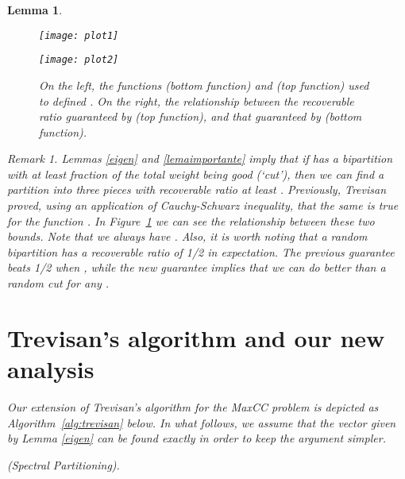 \documentclass{article}
\newtheorem{lemma}[theorem]{Lemma}
\theoremstyle{definition}
\theoremstyle{remark}
\newtheorem{rem}[theorem]{Remark}
\numberwithin{equation}{section}
\begin{document}
\begin{lemma}
\begin{figure}[ht!]
\begin{minipage}[t]{.5\textwidth}
  \centering
  \texttt{[image: plot1]}
\end{minipage}\begin{minipage}[t]{.5\textwidth}
  \centering
  \texttt{[image: plot2]}
\end{minipage}
  \caption{On the left, the functions  (bottom function) and  (top function) used to defined . On the right, the relationship between the recoverable ratio guaranteed by  (top function), and that guaranteed by  (bottom function). }
  \label{fig:plot1}
\end{figure}
\medskip
\begin{rem}\label{remark}
{\rm Lemmas \ref{eigen} and \ref{lemaimportante} imply that if  has a bipartition with at least  fraction of the total weight being good (`cut'), then we can  find a partition into three pieces  with recoverable ratio at least . 
Previously, Trevisan proved, using an application of Cauchy-Schwarz inequality, that the same is true for the function . In Figure~\ref{fig:plot1} we can see the relationship between these two bounds. Note that we always have . Also, it is worth noting that a random bipartition has a recoverable ratio of 1/2 in expectation. The previous guarantee  beats 1/2 when , while the new guarantee  implies that we can do better than a random cut for any .}

\end{rem}



\section{Trevisan's algorithm and our new analysis}
Our extension of Trevisan's algorithm for the MaxCC problem is depicted as Algorithm~\ref{alg:trevisan} below. In what follows, we assume that the vector  given by Lemma \ref{eigen} can be found exactly in order to keep the argument simpler.

\begin{algorithm}[!ht]
\caption{(Spectral Partitioning).}
\label{alg:trevisan}
\begin{algorithmic}[1]
\If{}
\Else{}
\If{} 
\Else 
{}
 \EndIf\EndIf
\end{algorithmic}
\end{algorithm}



\end{lemma}
\end{document}
